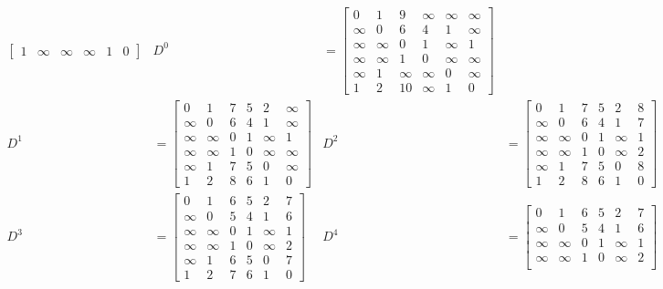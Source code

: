\documentclass[a4paper,11pt]{article}             %
\begin{document}
\begin{ex}
\begin{exlist}
\begin{align*}
\begin{bmatrix}
1 & \infty & \infty & \infty & 1 & 0 
\end{bmatrix}
& D^{0} &=
\begin{bmatrix}
0 & 1 & 9 & \infty & \infty & \infty  \\
\infty & 0 & 6 & 4 & 1 & \infty  \\
\infty & \infty & 0 & 1 & \infty & 1  \\
\infty & \infty & 1 & 0 & \infty & \infty  \\
\infty & 1 & \infty & \infty & 0 & \infty  \\
1 & 2 & 10 & \infty & 1 & 0 
\end{bmatrix} \\
D^{1} &=
\begin{bmatrix}
0 & 1 & 7 & 5 & 2 & \infty  \\
\infty & 0 & 6 & 4 & 1 & \infty  \\
\infty & \infty & 0 & 1 & \infty & 1  \\
\infty & \infty & 1 & 0 & \infty & \infty  \\
\infty & 1 & 7 & 5 & 0 & \infty  \\
1 & 2 & 8 & 6 & 1 & 0 
\end{bmatrix}
& D^{2} &=
\begin{bmatrix}
0 & 1 & 7 & 5 & 2 & 8  \\
\infty & 0 & 6 & 4 & 1 & 7  \\
\infty & \infty & 0 & 1 & \infty & 1  \\
\infty & \infty & 1 & 0 & \infty & 2  \\
\infty & 1 & 7 & 5 & 0 & 8  \\
1 & 2 & 8 & 6 & 1 & 0 
\end{bmatrix} \\
D^{3} &=
\begin{bmatrix}
0 & 1 & 6 & 5 & 2 & 7  \\
\infty & 0 & 5 & 4 & 1 & 6  \\
\infty & \infty & 0 & 1 & \infty & 1  \\
\infty & \infty & 1 & 0 & \infty & 2  \\
\infty & 1 & 6 & 5 & 0 & 7  \\
1 & 2 & 7 & 6 & 1 & 0 
\end{bmatrix}
& D^{4} &=
\begin{bmatrix}
0 & 1 & 6 & 5 & 2 & 7  \\
\infty & 0 & 5 & 4 & 1 & 6  \\
\infty & \infty & 0 & 1 & \infty & 1  \\
\infty & \infty & 1 & 0 & \infty & 2  \\

\end{bmatrix}
\end{align*}
\end{exlist}
\end{ex}
\end{document}
